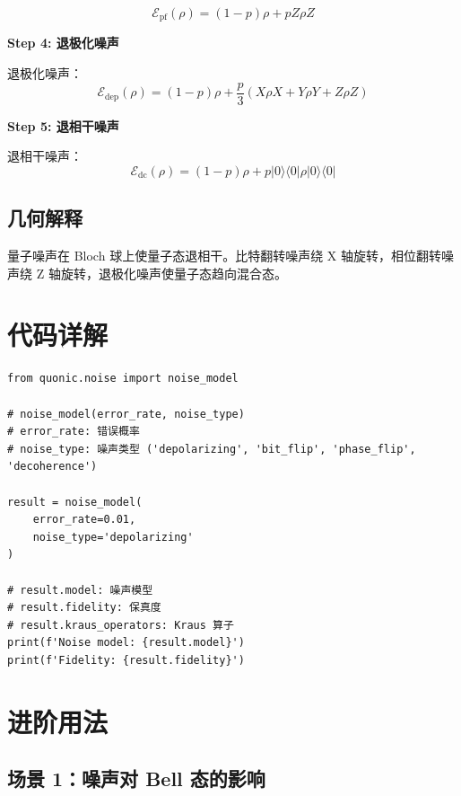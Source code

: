 \documentclass[12pt,a4paper]{article}
\begin{document}
\begin{equation}
\mathcal{E}_{\text{pf}}(\rho) = (1-p)\rho + p Z\rho Z
\end{equation}

\textbf{Step 4: 退极化噪声}

退极化噪声：
\begin{equation}
\mathcal{E}_{\text{dep}}(\rho) = (1-p)\rho + \frac{p}{3}(X\rho X + Y\rho Y + Z\rho Z)
\end{equation}

\textbf{Step 5: 退相干噪声}

退相干噪声：
\begin{equation}
\mathcal{E}_{\text{dc}}(\rho) = (1-p)\rho + p|0\rangle\langle 0|\rho|0\rangle\langle 0|
\end{equation}

\subsection{几何解释}

量子噪声在 Bloch 球上使量子态退相干。比特翻转噪声绕 X 轴旋转，相位翻转噪声绕 Z 轴旋转，退极化噪声使量子态趋向混合态。

\section{代码详解}

\begin{verbatim}
from quonic.noise import noise_model

# noise_model(error_rate, noise_type)
# error_rate: 错误概率
# noise_type: 噪声类型 ('depolarizing', 'bit_flip', 'phase_flip', 'decoherence')

result = noise_model(
    error_rate=0.01,
    noise_type='depolarizing'
)

# result.model: 噪声模型
# result.fidelity: 保真度
# result.kraus_operators: Kraus 算子
print(f'Noise model: {result.model}')
print(f'Fidelity: {result.fidelity}')
\end{verbatim}

\section{进阶用法}

\subsection{场景 1：噪声对 Bell 态的影响}
\end{document}
